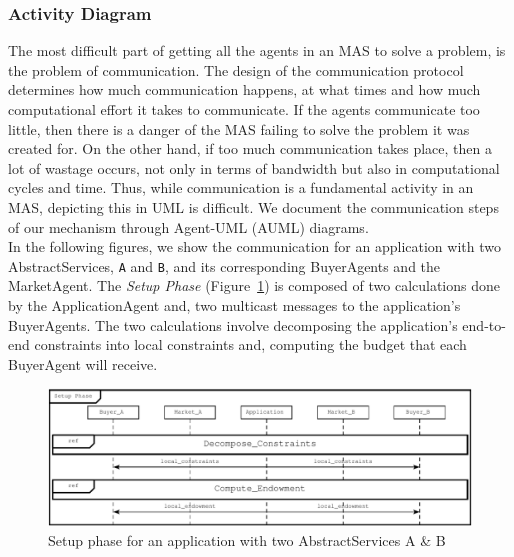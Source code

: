 \documentclass[10pt,journal,compsoc]{IEEEtran}
\begin{document}
\subsubsection{Activity Diagram} The most difficult part of getting all the agents in an MAS to solve a problem, is the problem of communication. The design of the communication protocol determines how much communication happens, at what times and how much computational effort it takes to communicate. If the agents communicate too little, then there is a danger of the MAS failing to solve the problem it was created for. On the other hand, if too much communication takes place, then a lot of wastage occurs, not only in terms of bandwidth but also in computational cycles and time. Thus, while communication is a fundamental activity in an MAS, depicting this in UML is difficult. 
We document the communication steps of our mechanism through Agent-UML (AUML) diagrams.\\
In the following figures, we show the communication for an application with two AbstractServices, \texttt{A} and \texttt{B}, and its corresponding BuyerAgents and the MarketAgent. The \emph{Setup Phase} (Figure~\ref{fig:setup_phase}) is composed of two calculations done by the ApplicationAgent and, two multicast messages to the application's BuyerAgents. The two calculations involve decomposing the application's end-to-end constraints into local constraints and, computing the budget that each BuyerAgent will receive.
\begin{figure}[htbp]
\centering
\includegraphics[scale=0.7]{drawings/setup_phase.pdf}
\caption{Setup phase for an application with two AbstractServices A \& B \label{fig:setup_phase}}
\end{figure}
\end{document}
